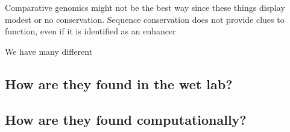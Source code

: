         Comparative genomics might not be the best way since these things display modest or no conservation. Sequence conservation does not provide clues to function, even if it is identified as an enhancer~\cite{pennacchio2013enhancers}
        
        
        We have many different 
        \subsection{How are they found in the wet lab?}
            
        \subsection{How are they found computationally?}
        
        
            
            
            
            
            
